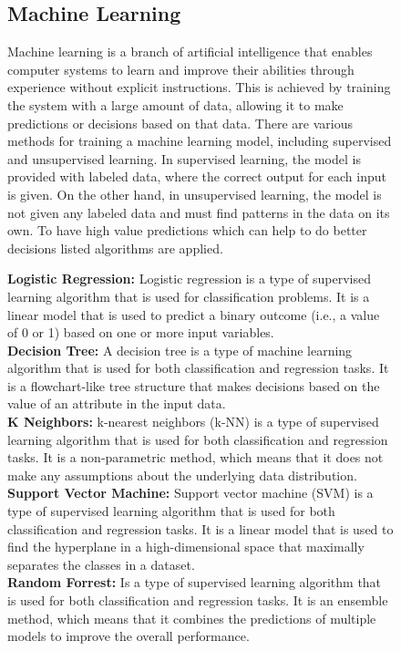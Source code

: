 \documentclass[letterpaper, 10 pt, conference]{ieeeconf}
\begin{document}
\begin{figure}[h!]
\subsection{Machine Learning} Machine learning is a branch of artificial intelligence that enables computer systems to learn and improve their abilities through experience without explicit instructions. This is achieved by training the system with a large amount of data, allowing it to make predictions or decisions based on that data. There are various methods for training a machine learning model, including supervised and unsupervised learning. In supervised learning, the model is provided with labeled data, where the correct output for each input is given. On the other hand, in unsupervised learning, the model is not given any labeled data and must find patterns in the data on its own. To have high value predictions which can help to do better decisions listed algorithms are applied.

\textbf{Logistic Regression:} Logistic regression is a type of supervised learning algorithm that is used for classification problems. It is a linear model that is used to predict a binary outcome (i.e., a value of 0 or 1) based on one or more input variables.\\
\textbf{Decision Tree:} A decision tree is a type of machine learning algorithm that is used for both classification and regression tasks. It is a flowchart-like tree structure that makes decisions based on the value of an attribute in the input data.\\
\textbf{K Neighbors:} k-nearest neighbors (k-NN) is a type of supervised learning algorithm that is used for both classification and regression tasks. It is a non-parametric method, which means that it does not make any assumptions about the underlying data distribution.\\
\textbf{Support Vector Machine:} Support vector machine (SVM) is a type of supervised learning algorithm that is used for both classification and regression tasks. It is a linear model that is used to find the hyperplane in a high-dimensional space that maximally separates the classes in a dataset.\\
\textbf{Random Forrest:} Is a type of supervised learning algorithm that is used for both classification and regression tasks. It is an ensemble method, which means that it combines the predictions of multiple models to improve the overall performance.
\end{figure}
\end{document}
